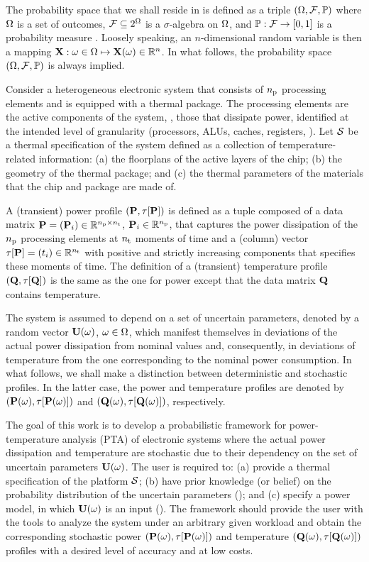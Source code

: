 
The probability space that we shall reside in is defined as a triple $(\Omega, \mathcal{F}, \mathbb{P})$ where $\Omega$ is a set of outcomes, $\mathcal{F} \subseteq 2^\Omega$ is a $\sigma$-algebra on $\Omega$, and $\mathbb{P}: \mathcal{F} \to [0, 1]$ is a probability measure \cite{maitre2010}.
Loosely speaking, an $n$-dimensional random variable is then a mapping $\mathbf{X}: \omega \in \Omega \mapsto \mathbf{X}(\omega) \in \mathbb{R}^n$.
In what follows, the probability space $(\Omega, \mathcal{F}, \mathbb{P})$ is always implied.

Consider a heterogeneous electronic system that consists of ${n_\text{p}}$ processing elements and is equipped with a thermal package.
The processing elements are the active components of the system, \ie, those that dissipate power, identified at the intended level of granularity (processors, ALUs, caches, registers, \etc).
Let $\mathcal{S}$ be a thermal specification of the system defined as a collection of temperature-related information: (a) the floorplans of the active layers of the chip; (b) the geometry of the thermal package; and (c) the thermal parameters of the materials that the chip and package are made of.

A (transient) power profile $\profileP$ is defined as a tuple composed of a data matrix $\mP = (\vP_i) \in \real^{\nprocs \times \nsteps}$, $\mathbf{P}_i \in \mathbb{R}^{n_\text{p}}$, that captures the power dissipation of the ${n_\text{p}}$ processing elements at ${n_\text{t}}$ moments of time and a (column) vector $\partition{\mP} = (\t_i) \in \real^{\nsteps}$ with positive and strictly increasing components that specifies these moments of time.
The definition of a (transient) temperature profile $\profileT$ is the same as the one for power except that the data matrix $\mTO$ contains temperature.

The system is assumed to depend on a set of uncertain parameters, denoted by a random vector $\mathbf{U}(\omega)$, $\omega \in \Omega$, which manifest themselves in deviations of the actual power dissipation from nominal values and, consequently, in deviations of temperature from the one corresponding to the nominal power consumption.
In what follows, we shall make a distinction between deterministic and stochastic profiles.
In the latter case, the power and temperature profiles are denoted by $\profileP{\o}$ and $\profileT{\o}$, respectively.

The goal of this work is to develop a probabilistic framework for power-temperature analysis (PTA) of electronic systems where the actual power dissipation and temperature are stochastic due to their dependency on the set of uncertain parameters $\mathbf{U}(\omega)$.
The user is required to: (a) provide a thermal specification of the platform $\mathcal{S}$; (b) have prior knowledge (or belief) on the probability distribution of the uncertain parameters (); and (c) specify a power model, in which $\mathbf{U}(\omega)$ is an input ().
The framework should provide the user with the tools to analyze the system under an arbitrary given workload and obtain the corresponding stochastic power $\profileP{\o}$ and temperature $\profileT{\o}$ profiles with a desired level of accuracy and at low costs.
